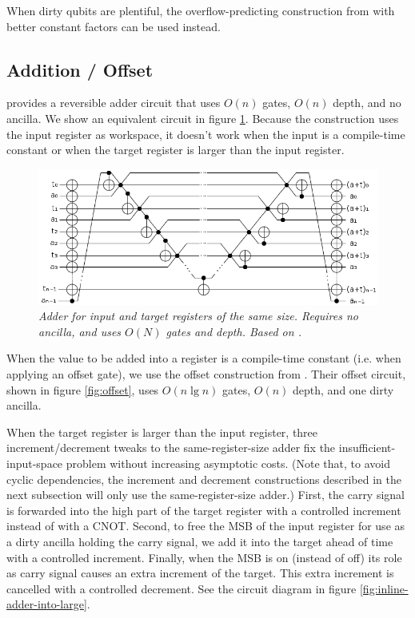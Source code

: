 \documentclass[twocolumn]{article}
\begin{document}
When dirty qubits are plentiful, the overflow-predicting construction from \cite{haner2016} with better constant factors can be used instead.


\subsection{Addition / Offset}

\cite{takahashi2005} provides a reversible adder circuit that uses $O(n)$ gates, $O(n)$ depth, and no ancilla.
We show an equivalent circuit in figure \ref{fig:inlineadder}.
Because the construction uses the input register as workspace, it doesn't work when the input is a compile-time constant or when the target register is larger than the input register.

\begin{figure}
  \centering
  \includegraphics[width=\linewidth]{assets/inline-adder.png}
  \caption{\em Adder for input and target registers of the same size.
  Requires no ancilla, and uses $O(N)$ gates and depth.
  Based on \cite{van2004, takahashi2005}.}
  \label{fig:inlineadder}
\end{figure}

When the value to be added into a register is a compile-time constant (i.e. when applying an offset gate), we use the offset construction from \cite{haner2016}.
Their offset circuit, shown in figure \ref{fig:offset}, uses $O(n \lg n)$ gates, $O(n)$ depth, and one dirty ancilla.

When the target register is larger than the input register, three increment/decrement tweaks to the same-register-size adder fix the insufficient-input-space problem without increasing asymptotic costs.
(Note that, to avoid cyclic dependencies, the increment and decrement constructions described in the next subsection will only use the same-register-size adder.)
First, the carry signal is forwarded into the high part of the target register with a controlled increment instead of with a CNOT.
Second, to free the MSB of the input register for use as a dirty ancilla holding the carry signal, we add it into the target ahead of time with a controlled increment.
Finally, when the MSB is on (instead of off) its role as carry signal causes an extra increment of the target.
This extra increment is cancelled with a controlled decrement.
See the circuit diagram in figure \ref{fig:inline-adder-into-large}.
\end{document}

